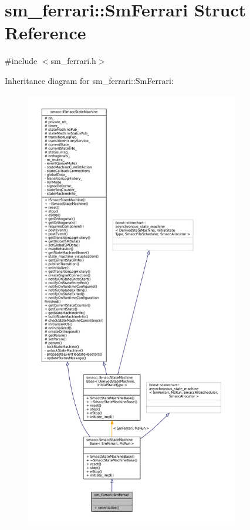 \hypertarget{structsm__ferrari_1_1SmFerrari}{}\section{sm\+\_\+ferrari\+:\+:Sm\+Ferrari Struct Reference}
\label{structsm__ferrari_1_1SmFerrari}


{\ttfamily \#include $<$sm\+\_\+ferrari.\+h$>$}



Inheritance diagram for sm\+\_\+ferrari\+:\+:Sm\+Ferrari\+:
\nopagebreak
\begin{figure}[H]
\begin{center}
\leavevmode
\includegraphics[height=550pt]{structsm__ferrari_1_1SmFerrari__inherit__graph}
\end{center}
\end{figure}


